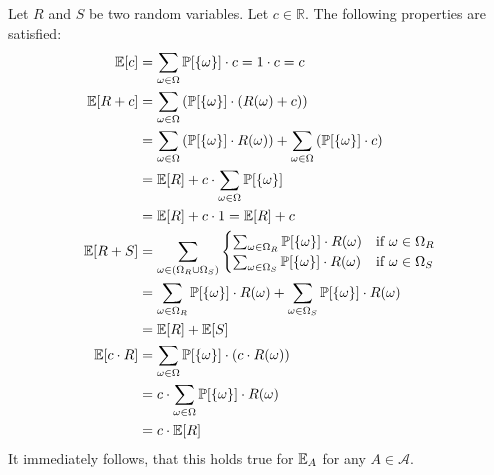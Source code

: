 Let $R$ and $S$ be two random variables. Let $c \in \mathbb R$.
The following properties are satisfied:
\begin{align}
  \mathbb E[c]     &= \sum_{\omega \in \Omega} \mathbb P[\left\{\omega\right\}] \cdot c = 1 \cdot c = c \\
  \mathbb E[R + c] &= \sum_{\omega \in \Omega} \left(\mathbb P[\left\{\omega\right\}] \cdot (R(\omega) + c)\right) \notag\\
            &= \sum_{\omega \in \Omega} \left(\mathbb P[\left\{\omega\right\}] \cdot R(\omega)\right) + \sum_{\omega \in \Omega} \left(\mathbb P[\left\{\omega\right\}] \cdot c\right) \notag\\
            &= \mathbb E[R] + c \cdot \sum_{\omega \in \Omega} \mathbb P[\left\{\omega\right\}] \notag\\
            &= \mathbb E[R] + c \cdot 1 = \mathbb E[R] + c \\
  \mathbb E[R + S] &= \sum_{\omega \in (\Omega_R \cup \Omega_S)}
              \begin{cases}
                \sum_{\omega \in \Omega_R} \mathbb P[\left\{\omega\right\}] \cdot R(\omega) & \text{if } \omega \in \Omega_R \\
                \sum_{\omega \in \Omega_S} \mathbb P[\left\{\omega\right\}] \cdot R(\omega) & \text{if } \omega \in \Omega_S
              \end{cases}\notag\\
            &= \sum_{\omega \in \Omega_R} \mathbb P[\left\{\omega\right\}] \cdot R(\omega) + \sum_{\omega \in \Omega_S} \mathbb P[\left\{\omega\right\}] \cdot R(\omega) \notag\\
            &= \mathbb E[R] + \mathbb E[S] \label{eq:ERS-RpS} \\
  \mathbb E[c \cdot R]
            &= \sum_{\omega \in \Omega} \mathbb P[\left\{\omega\right\}] \cdot (c \cdot R(\omega)) \notag\\
            &= c \cdot \sum_{\omega \in \Omega} \mathbb P[\left\{\omega\right\}] \cdot R(\omega) \notag\\
            &= c \cdot \mathbb E[R]
\end{align}
It immediately follows, that this holds true for $\mathbb E_A$ for any $A \in \mathcal A$.

